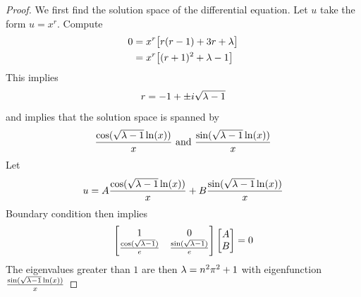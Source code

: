 \documentclass{report}
\begin{document}
\begin{proof}
We first find the solution space of the differential equation. Let $u$ take the form $u=x^r$. Compute 
\begin{align*}
0&= x^r \big[r(r-1)+ 3r + \lambda \big]   \\
&= x^r\big[ (r+1)^2 + \lambda -1 \big]
\end{align*}
This implies 
\begin{align*}
r=-1 + \pm i \sqrt{\lambda -1} 
\end{align*}
and implies that the solution space is spanned by 
\begin{align*}
\frac{\cos (\sqrt{\lambda -1} \ln (x) )}{x}\text{ and }\frac{\sin (\sqrt{\lambda -1}\ln (x) )}{x}
\end{align*}
Let 
\begin{align*}
u=A \frac{\cos (\sqrt{\lambda -1} \ln (x))}{x}+ B \frac{\sin (\sqrt{\lambda -1} \ln (x))}{x}
\end{align*}
Boundary condition then implies 
\begin{align*}
\begin{bmatrix}
  1 & 0 \\
  \frac{\cos (\sqrt{\lambda -1} )}{e} & \frac{\sin (\sqrt{\lambda -1} )}{e}
\end{bmatrix} \begin{bmatrix}
A\\
B
\end{bmatrix}=0
\end{align*}
The eigenvalues greater than $1$ are then $\lambda =n^2\pi ^2+1$ with eigenfunction $\frac{\sin (\sqrt{\lambda-1} \ln (x) )}{x}$ 
\end{proof}
\end{document}

